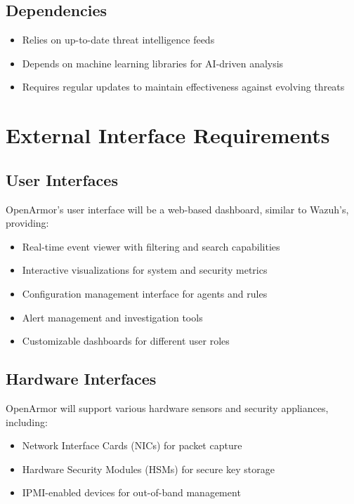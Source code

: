 \subsection{Dependencies}
\begin{itemize}
    \item Relies on up-to-date threat intelligence feeds
    \item Depends on machine learning libraries for AI-driven analysis
    \item Requires regular updates to maintain effectiveness against evolving threats
\end{itemize}

\section{External Interface Requirements}

\subsection{User Interfaces}
OpenArmor's user interface will be a web-based dashboard, similar to Wazuh's, providing:
\begin{itemize}
    \item Real-time event viewer with filtering and search capabilities
    \item Interactive visualizations for system and security metrics
    \item Configuration management interface for agents and rules
    \item Alert management and investigation tools
    \item Customizable dashboards for different user roles
\end{itemize}

\subsection{Hardware Interfaces}
OpenArmor will support various hardware sensors and security appliances, including:
\begin{itemize}
    \item Network Interface Cards (NICs) for packet capture
    \item Hardware Security Modules (HSMs) for secure key storage
    \item IPMI-enabled devices for out-of-band management
\end{itemize}

